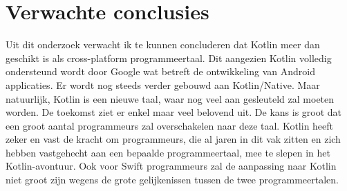 	\section{Verwachte conclusies}
	\label{sec:verwachte_conclusies}
	Uit dit onderzoek verwacht ik te kunnen concluderen dat Kotlin meer dan geschikt is als cross-platform programmeertaal. Dit aangezien Kotlin volledig ondersteund wordt door Google wat betreft de ontwikkeling van Android applicaties. Er wordt nog steeds verder gebouwd aan Kotlin/Native. Maar natuurlijk, Kotlin is een nieuwe taal, waar nog veel aan gesleuteld zal moeten worden. De toekomst ziet er enkel maar veel belovend uit. De kans is groot dat een groot aantal programmeurs zal overschakelen naar deze taal. Kotlin heeft zeker en vast de kracht om programmeurs, die al jaren in dit vak zitten en zich hebben vastgehecht aan een bepaalde programmeertaal, mee te slepen in het Kotlin-avontuur. Ook voor Swift programmeurs zal de aanpassing naar Kotlin niet groot zijn wegens de grote gelijkenissen tussen de twee programmeertalen.
	

